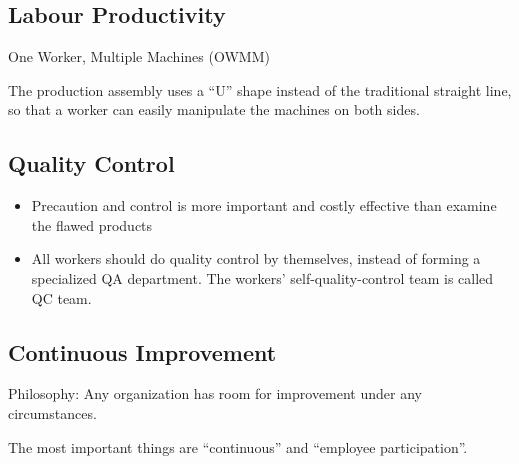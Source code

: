 \documentclass{article}
\begin{document}
\subsection{Labour Productivity}

One Worker, Multiple Machines (OWMM)

The production assembly uses a ``U'' shape instead of the traditional straight line,
so that a worker can easily manipulate the machines on both sides.

\subsection{Quality Control}

\begin{itemize}
	\item Precaution and control is more important and costly effective than examine the flawed products
	\item All workers should do quality control by themselves, instead of forming a specialized QA department.
					The workers' self-quality-control team is called QC team.
\end{itemize}

\subsection{Continuous Improvement}

Philosophy: Any organization has room for improvement under any circumstances.

The most important things are ``continuous'' and ``employee participation''.




\end{document}
